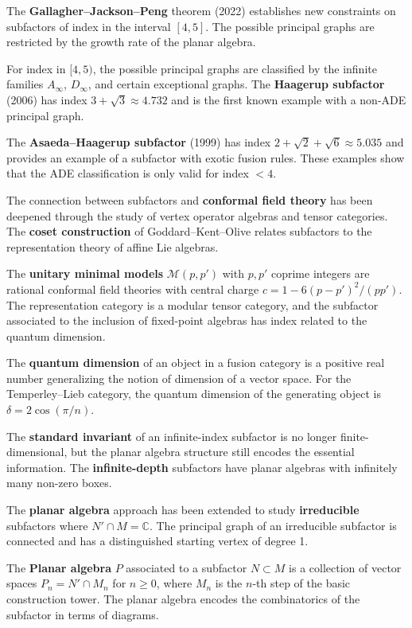 The \textbf{Gallagher--Jackson--Peng} theorem (2022) establishes new constraints on subfactors of index in the interval $[4, 5]$. The possible principal graphs are restricted by the growth rate of the planar algebra.

For index in $[4, 5)$, the possible principal graphs are classified by the infinite families $A_\infty$, $D_\infty$, and certain exceptional graphs. The \textbf{Haagerup subfactor} (2006) has index $3 + \sqrt{3} \approx 4.732$ and is the first known example with a non-ADE principal graph.

The \textbf{Asaeda--Haagerup subfactor} (1999) has index $2 + \sqrt{2} + \sqrt{6} \approx 5.035$ and provides an example of a subfactor with exotic fusion rules. These examples show that the ADE classification is only valid for index $< 4$.

The connection between subfactors and \textbf{conformal field theory} has been deepened through the study of vertex operator algebras and tensor categories. The \textbf{coset construction} of Goddard--Kent--Olive relates subfactors to the representation theory of affine Lie algebras.

The \textbf{unitary minimal models} $\mathcal{M}(p, p')$ with $p, p'$ coprime integers are rational conformal field theories with central charge $c = 1 - 6(p-p')^2/(pp')$. The representation category is a modular tensor category, and the subfactor associated to the inclusion of fixed-point algebras has index related to the quantum dimension.

The \textbf{quantum dimension} of an object in a fusion category is a positive real number generalizing the notion of dimension of a vector space. For the Temperley--Lieb category, the quantum dimension of the generating object is $\delta = 2\cos(\pi/n)$.

The \textbf{standard invariant} of an infinite-index subfactor is no longer finite-dimensional, but the planar algebra structure still encodes the essential information. The \textbf{infinite-depth} subfactors have planar algebras with infinitely many non-zero boxes.

The \textbf{planar algebra} approach has been extended to study \textbf{irreducible} subfactors where $N' \cap M = \mathbb{C}$. The principal graph of an irreducible subfactor is connected and has a distinguished starting vertex of degree 1.

The \textbf{Planar algebra} $P$ associated to a subfactor $N \subset M$ is a collection of vector spaces $P_n = N' \cap M_n$ for $n \geq 0$, where $M_n$ is the $n$-th step of the basic construction tower. The planar algebra encodes the combinatorics of the subfactor in terms of diagrams.

